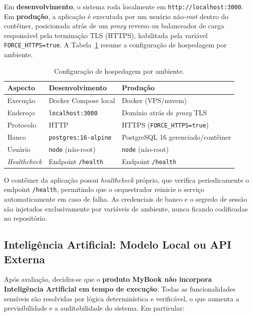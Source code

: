 \documentclass[a4paper,12pt]{article}
\begin{document}
Em \textbf{desenvolvimento}, o sistema roda localmente em \texttt{http://localhost:3000}.
Em \textbf{produção}, a aplicação é executada por um usuário não-\emph{root} dentro do
contêiner, posicionada atrás de um \emph{proxy} reverso ou balanceador de carga
responsável pela terminação TLS (HTTPS), habilitada pela variável
\texttt{FORCE\_HTTPS=true}. A Tabela~\ref{tab:hosting} resume a configuração de
hospedagem por ambiente.

\begin{table}[H]
    \centering
    \caption{Configuração de hospedagem por ambiente.}
    \label{tab:hosting}
    \begin{tabular}{lll}
        \toprule
        \textbf{Aspecto} & \textbf{Desenvolvimento} & \textbf{Produção} \\
        \midrule
        Execução       & Docker Compose local        & Docker (VPS/nuvem) \\
        Endereço       & \texttt{localhost:3000}     & Domínio atrás de \emph{proxy} TLS \\
        Protocolo      & HTTP                        & HTTPS (\texttt{FORCE\_HTTPS=true}) \\
        Banco          & \texttt{postgres:16-alpine} & PostgreSQL 16 gerenciado/contêiner \\
        Usuário        & \texttt{node} (não-root)    & \texttt{node} (não-root) \\
        \emph{Healthcheck} & Endpoint \texttt{/health} & Endpoint \texttt{/health} \\
        \bottomrule
    \end{tabular}
\end{table}

O contêiner da aplicação possui \emph{healthcheck} próprio, que verifica
periodicamente o endpoint \texttt{/health}, permitindo que o orquestrador reinicie o
serviço automaticamente em caso de falha. As credenciais de banco e o segredo de
sessão são injetados exclusivamente por variáveis de ambiente, nunca ficando
codificadas no repositório.

\subsection{Inteligência Artificial: Modelo Local ou API Externa}

Após avaliação, decidiu-se que o \textbf{produto MyBook não incorpora Inteligência
Artificial em tempo de execução}. Todas as funcionalidades sensíveis são resolvidas por
lógica determinística e verificável, o que aumenta a previsibilidade e a auditabilidade
do sistema. Em particular:
\end{document}
